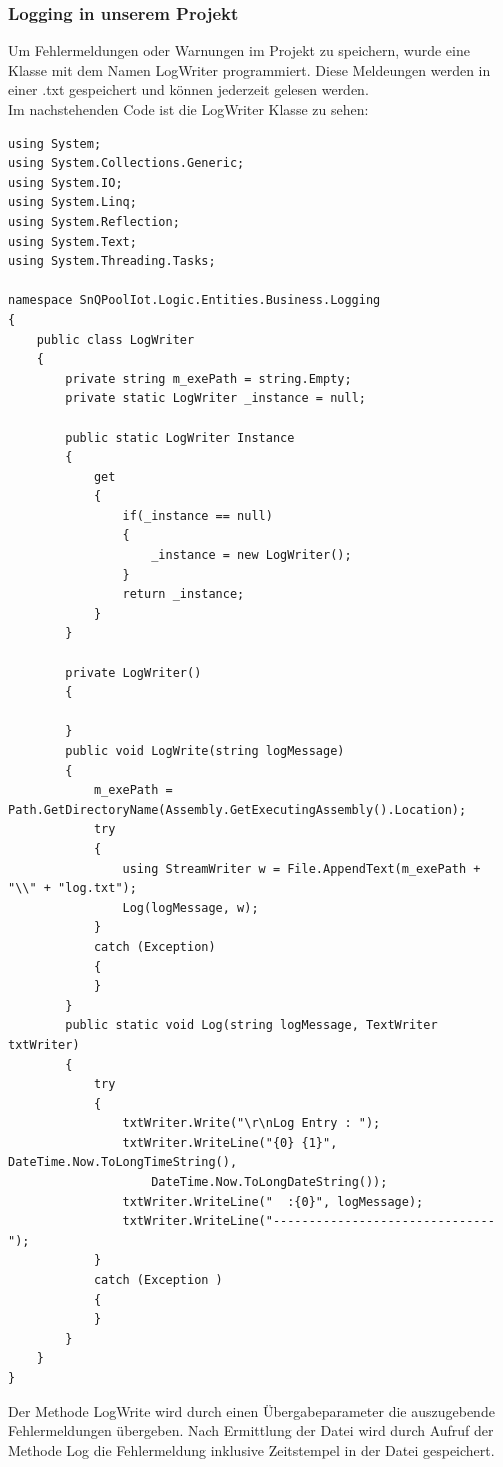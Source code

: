 \subsubsection{Logging in unserem Projekt}
Um Fehlermeldungen oder Warnungen im Projekt zu speichern, wurde eine Klasse mit dem Namen LogWriter programmiert.
Diese Meldeungen werden in einer .txt gespeichert und können jederzeit gelesen werden.
\\Im nachstehenden Code ist die LogWriter Klasse zu sehen:
\\
\begin{lstlisting}[caption={Logwriter Klasse}]
using System;
using System.Collections.Generic;
using System.IO;
using System.Linq;
using System.Reflection;
using System.Text;
using System.Threading.Tasks;

namespace SnQPoolIot.Logic.Entities.Business.Logging
{
    public class LogWriter
    {
        private string m_exePath = string.Empty;
        private static LogWriter _instance = null;

        public static LogWriter Instance
        {
            get
            {
                if(_instance == null)
                {
                    _instance = new LogWriter();
                }
                return _instance;
            }
        }

        private LogWriter()
        {

        }
        public void LogWrite(string logMessage)
        {
            m_exePath = Path.GetDirectoryName(Assembly.GetExecutingAssembly().Location);
            try
            {
                using StreamWriter w = File.AppendText(m_exePath + "\\" + "log.txt");
                Log(logMessage, w);
            }
            catch (Exception)
            {
            }
        }
        public static void Log(string logMessage, TextWriter txtWriter)
        {
            try
            {
                txtWriter.Write("\r\nLog Entry : ");
                txtWriter.WriteLine("{0} {1}", DateTime.Now.ToLongTimeString(),
                    DateTime.Now.ToLongDateString());
                txtWriter.WriteLine("  :{0}", logMessage);
                txtWriter.WriteLine("-------------------------------");
            }
            catch (Exception )
            {
            }
        }
    }
}
\end{lstlisting}

Der Methode LogWrite wird durch einen Übergabeparameter die auszugebende Fehlermeldungen übergeben. Nach Ermittlung der Datei wird durch Aufruf der Methode Log 
die Fehlermeldung inklusive Zeitstempel in der Datei gespeichert.
\\
\\

